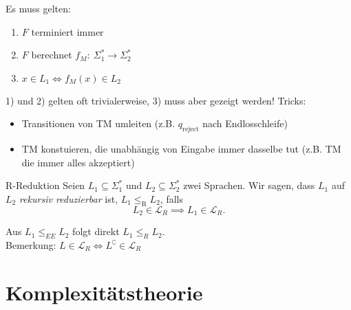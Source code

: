 \documentclass[a4paper,10pt]{article}
\begin{document}
Es muss gelten:
\begin{enumerate}
    \item $F$ terminiert immer
    \item $F$ berechnet $f_M:\: \Sigma_1^* \to \Sigma_2^*$
    \item $x \in L_1 \iff f_M(x) \in L_2$
\end{enumerate}
1) und 2) gelten oft trivialerweise, 3) muss aber gezeigt werden!
Tricks:
\begin{itemize}
    \item Transitionen von TM umleiten (z.B. $q_\textrm{reject}$ nach Endlosschleife)
    \item TM konstuieren, die unabhängig von Eingabe immer dasselbe tut (z.B. TM die immer alles akzeptiert)
\end{itemize}
\begin{mainbox}{R-Reduktion}
    Seien $L_1 \subseteq \Sigma_1^*$ und $L_2 \subseteq \Sigma_2^*$ zwei Sprachen. Wir sagen, dass $L_1$ auf $L_2$ \emph{rekursiv reduzierbar} ist, $L_1 \leq_\textrm{R} L_2$, falls
    \[L_2 \in \mathcal{L}_R \implies L_1 \in \mathcal{L}_R \text{.}\]
\end{mainbox}
Aus $L_1 \leq_{EE} L_2$ folgt direkt $L_1 \leq_R L_2$.\\
Bemerkung: $L \in \mathcal{L}_R \iff L^\complement \in \mathcal{L}_R$

\section{Komplexitätstheorie}
    
\end{document}
